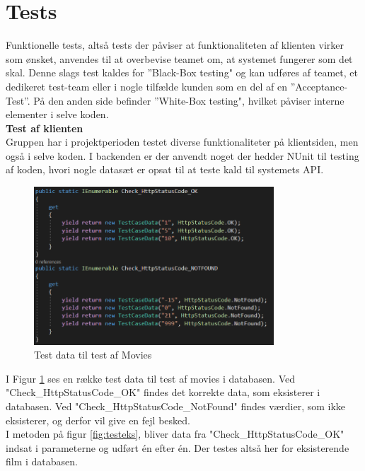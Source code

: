 \section{Tests}\label{sec:tests}
Funktionelle tests, altså tests der påviser at funktionaliteten af klienten virker som ønsket, 
anvendes til at overbevise teamet om, at systemet fungerer som det skal. 
Denne slags test kaldes for ”Black-Box testing" og kan udføres af teamet, 
et dedikeret test-team eller i nogle tilfælde kunden som en del af en ”Acceptance-Test”. 
På den anden side befinder ”White-Box testing", hvilket påviser interne elementer i selve koden. \\

\textbf{Test af klienten} \\
Gruppen har i projektperioden testet diverse funktionaliteter på klientsiden, 
men også i selve koden. I backenden er der anvendt noget der hedder NUnit til testing af koden, 
hvori nogle datasæt er opsat til at teste kald til systemets API.\\

\begin{figure}[H]
    \centering
    \includegraphics[width=0.8\textwidth]{figures/testmoviedata.PNG}
    \caption{Test data til test af Movies}
    \label{fig:testdata}
\end{figure}

I Figur \ref{fig:testdata} ses en række test data til test af movies i databasen. Ved "Check\_HttpStatusCode\_OK" findes det korrekte data,
som eksisterer i databasen. Ved "Check\_HttpStatusCode\_NotFound" findes værdier, som ikke eksisterer, og derfor vil give
en fejl besked. \\

I metoden på figur \ref{fig:testeks}, bliver data fra "Check\_HttpStatusCode\_OK" indsat i parameterne
og udført én efter én. Der testes altså her for eksisterende film i databasen. 

